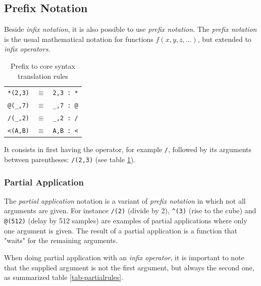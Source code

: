 \subsection{Prefix Notation}

Beside \emph{infix notation}, it is also possible to use \emph{prefix notation}. 
The \emph{prefix notation} is the usual mathematical notation for functions $f(x,y,z,\ldots)$, but extended to \emph{infix operators}. 
%
\begin{table}[h!]
	\begin{center}
	\begin{tabular}{|rcl|}
	\hline
	\lstinline'*(2,3)' & $\equiv$ & \lstinline'2,3 : *'\\
	\lstinline'@(_,7)' & $\equiv$ & \lstinline'_,7 : @'\\
	\lstinline'/(_,2)' & $\equiv$ & \lstinline'_,2 : /'\\
	\lstinline'<(A,B)' & $\equiv$ & \lstinline'A,B : <'\\
	\hline
	\end{tabular}
	\end{center}
	\caption{Prefix to core syntax translation rules}
	\label{tab-prefixrules}
\end{table}

It consists in first having the operator, for example \lstinline'/', followed by its arguments between parentheses: \lstinline'/(2,3)' (see table \ref{tab-prefixrules}). 

\subsubsection{Partial Application}

The \emph{partial application} notation is a variant of \emph{prefix notation} in which not all arguments are given. For instance  \lstinline'/(2)' (divide by 2), \lstinline'^(3)'  (rise to the cube) and \lstinline'@(512)' (delay by 512 samples) are examples of partial applications where only one argument is given. The result of a partial application is a function that "waits" for the remaining arguments. 

When doing partial application with an \emph{infix operator}, it is important to note that the supplied argument is not the first argument, but always the second one, as summarized table \ref{tab-partialrules}. 


